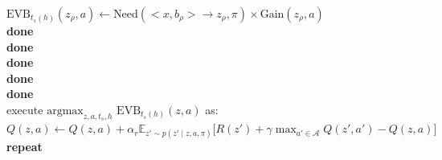 \documentclass{article}
\begin{document}
\hspace*{0.5cm} \hspace*{0.5cm} \hspace*{0.5cm} \hspace*{0.5cm} \hspace*{0.5cm} \hspace*{0.5cm} $\text{EVB}_{t_{s}(h)}(z_{\rho}, a) \leftarrow \text{Need}(<x, b_{\rho}> \rightarrow z_{\rho}, \pi) \times \text{Gain}(z_{\rho}, a)$\\
\hspace*{0.5cm} \hspace*{0.5cm} \hspace*{0.5cm} \hspace*{0.5cm} \hspace*{0.5cm} \textbf{done} \\
\hspace*{0.5cm} \hspace*{0.5cm} \hspace*{0.5cm} \hspace*{0.5cm} \textbf{done}\\
\hspace*{0.5cm} \hspace*{0.5cm} \hspace*{0.5cm} \textbf{done}\\
\hspace*{0.5cm} \hspace*{0.5cm} \textbf{done}\\
\hspace*{0.5cm} \textbf{done}\\
\hspace*{0.5cm} execute $\text{argmax}_{z, a, t_{s}, h} \, \, \text{EVB}_{t_{s}(h)}(z, a)$ as:\\
\hspace*{0.5cm} \hspace*{0.5cm} $Q(z, a) \leftarrow Q(z, a) + \alpha_r \mathbb{E}_{z'\sim p(z'\mid z, a, \pi)}\big[R(z') + \gamma \max_{a' \in \mathcal{A}}Q(z', a') - Q(z, a)\big]$\\
\textbf{repeat}
\end{document}
